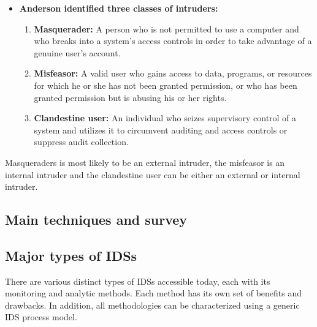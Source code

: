 \documentclass[12pt]{article}
\begin{document}
    \begin{itemize}
        \item \textbf{Anderson identified three classes of intruders:}
        \begin{enumerate}
        \item \textbf{Masquerader: }A person who is not permitted to use a computer and who breaks into a system's access controls in order to take advantage of a genuine user's account.
        \item \textbf{Misfeasor: }A valid user who gains access to data, programs, or resources for which he or she has not been granted permission, or who has been granted permission but is abusing his or her rights.
        \item \textbf{Clandestine user: }An individual who seizes supervisory control of a system and utilizes it to circumvent auditing and access controls or suppress audit collection.
        \end{enumerate}
    \end{itemize}
    \par Masqueraders is most likely to be an external intruder, the misfeasor is an internal intruder and the clandestine user can be either an external or internal intruder.
    \clearpage
    \\
    
    \begin{center}
        \huge{\section{Main techniques and survey}\label{sec:intro}}
    \end{center}
    
    \subsection{Major types of IDSs}
    \par There are various distinct types of IDSs accessible today, each with its monitoring and analytic methods. Each method has its own set of benefits and drawbacks. In addition, all methodologies can be characterized using a generic IDS process model.
     
    
\end{document}
